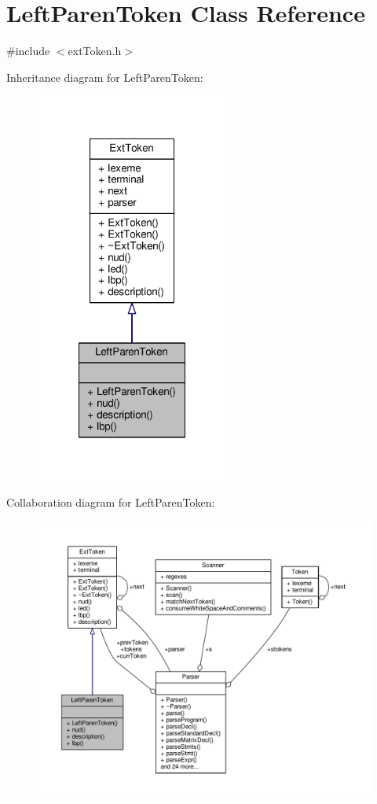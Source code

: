 \hypertarget{classLeftParenToken}{\section{Left\-Paren\-Token Class Reference}
\label{classLeftParenToken}
}


{\ttfamily \#include $<$ext\-Token.\-h$>$}



Inheritance diagram for Left\-Paren\-Token\-:\nopagebreak
\begin{figure}[H]
\begin{center}
\leavevmode
\includegraphics[width=180pt]{classLeftParenToken__inherit__graph}
\end{center}
\end{figure}


Collaboration diagram for Left\-Paren\-Token\-:\nopagebreak
\begin{figure}[H]
\begin{center}
\leavevmode
\includegraphics[width=350pt]{classLeftParenToken__coll__graph}
\end{center}
\end{figure}
